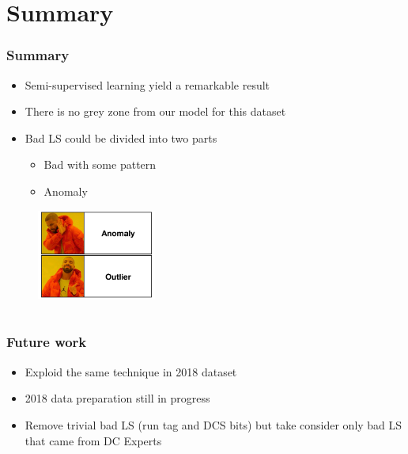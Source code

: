 \documentclass{beamer}
\begin{document}
\section{Summary} %
\begin{frame}
\frametitle{Summary}
\begin{itemize}
    \item Semi-supervised learning yield a remarkable result
    \item There is no grey zone from our model for this dataset
    \item Bad LS could be divided into two parts
    \begin{itemize}
        \item Bad with some pattern
        \item Anomaly
    \end{itemize}
\end{itemize}
\begin{figure}
    \includegraphics[height=0.4\textheight, width=0.35\textwidth]{images/meme_outlier}
\end{figure}
\end{frame}
\section{}

\begin{frame}
\frametitle{Future work}
\begin{itemize}
    \item Exploid the same technique in 2018 dataset
    \item 2018 data preparation still in progress
    \item Remove trivial bad LS (run tag and DCS bits) but take consider only bad LS that came from DC Experts
\end{itemize}
\end{frame}
\end{document}
